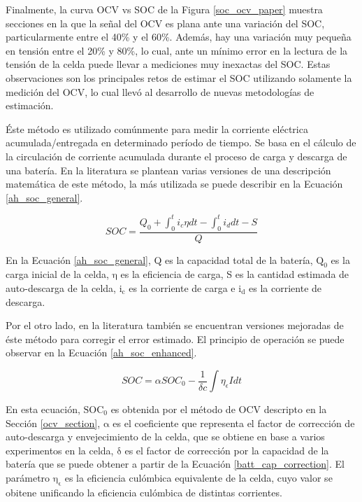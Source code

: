 \documentclass[10pt,a4paper]{article}
\newcounter{subsubsubsection}[subsubsection]
\begin{document}
\noindent Finalmente, la curva \acrshort{OCV} vs \acrshort{SOC} de la Figura
\ref{soc_ocv_paper} muestra secciones en la que la señal del \acrshort{OCV} es
plana ante una variaci\'on del \acrshort{SOC}, particularmente entre el 40\% y
el 60\%. Adem\'as, hay una variaci\'on muy pequeña en tensi\'on entre el 20\% y
80\%, lo cual, ante un m\'inimo error en la lectura de la tensi\'on de la celda
puede llevar a mediciones muy inexactas del \acrshort{SOC}. Estas observaciones
son los principales retos de estimar el \acrshort{SOC} utilizando solamente la
medici\'on del \acrshort{OCV}, lo cual llev\'o al desarrollo de nuevas
metodolog\'ias de estimaci\'on.

\newpage

\label{ahMethod}

\noindent \'Este m\'etodo es utilizado com\'unmente para medir la corriente
el\'ectrica acumulada/entregada en determinado per\'iodo de tiempo. Se basa en
el c\'alculo de la circulaci\'on de corriente acumulada durante el proceso de
carga y descarga de una bater\'ia. En la literatura se plantean varias versiones
de una descripci\'on matem\'atica de este m\'etodo, la m\'as utilizada se
puede describir en la Ecuaci\'on \ref{ah_soc_general}.

\begin{equation}
    SOC = \frac{Q_0 + \int_{0}^t i_c\eta dt - \int_{0}^t i_d dt - S}{Q}
    \label{ah_soc_general}
\end{equation}

\noindent En la Ecuaci\'on \ref{ah_soc_general}, Q es la capacidad total de la 
bater\'ia, $\mathrm{Q_0}$ es la carga inicial de la celda, $\mathrm{\eta}$ es la 
eficiencia de carga, S es la cantidad estimada de auto-descarga de la celda, 
$\mathrm{i_c}$ es la corriente de carga e $\mathrm{i_d}$ es la corriente de 
descarga.

\noindent Por el otro lado, en la literatura tambi\'en se encuentran versiones
mejoradas de \'este m\'etodo para corregir el error estimado. El principio de
operaci\'on se puede observar en la Ecuaci\'on \ref{ah_soc_enhanced}.

\begin{equation}
    SOC = \alpha SOC_0 - \frac{1}{\delta c}\int \eta_\epsilon I dt
    \label{ah_soc_enhanced}
\end{equation}

En esta ecuaci\'on, $\mathrm{SOC_0}$ es obtenida por el m\'etodo de
\acrshort{OCV} descripto en la Secci\'on \ref{ocv_section}, $\mathrm{\alpha}$ es
el coeficiente que representa el factor de correcci\'on de auto-descarga y
envejecimiento de la celda, que se obtiene en base a varios experimentos en la
celda, $\mathrm{\delta}$ es el factor de correcci\'on por la capacidad de la
bater\'ia que se puede obtener a partir de la Ecuaci\'on
\ref{batt_cap_correction}. El par\'ametro $\mathrm{\eta_\epsilon}$ es la
eficiencia cul\'ombica equivalente de la celda, cuyo valor se obitene unificando
la eficiencia cul\'ombica de distintas corrientes.
\end{document}

